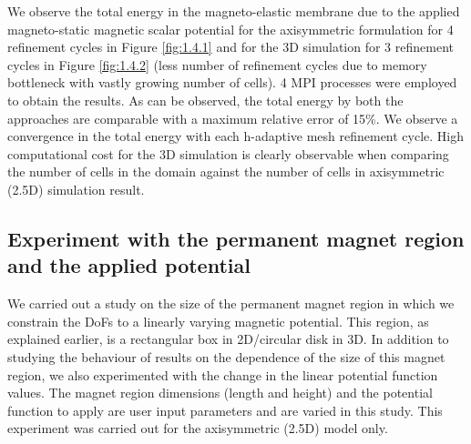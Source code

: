 We observe the total energy in the magneto-elastic membrane due to the applied magneto-static magnetic scalar potential for the axisymmetric formulation for 4 refinement cycles in Figure \eqref{fig:1.4.1} and for the 3D simulation for 3 refinement cycles in Figure \eqref{fig:1.4.2} (less number of refinement cycles due to memory bottleneck with vastly growing number of cells). 4 MPI processes were employed to obtain the results. As can be observed, the total energy by both the approaches are comparable with a maximum relative error of 15\%. We observe a convergence in the total energy with each h-adaptive mesh refinement cycle. High computational cost for the 3D simulation is clearly observable when comparing the number of cells in the domain against the number of cells in axisymmetric (2.5D) simulation result. \par 

\subsection{Experiment with the permanent magnet region and the applied potential}
We carried out a study on the size of the permanent magnet region in which we constrain the DoFs to a linearly varying magnetic potential. This region, as explained earlier, is a rectangular box in 2D/circular disk in 3D. In addition to studying the behaviour of results on the dependence of the size of this magnet region, we also experimented with the change in the linear potential function values. The magnet region dimensions (length and height) and the potential function to apply are user input parameters and are varied in this study. This experiment was carried out for the axisymmetric (2.5D) model only.\par 

